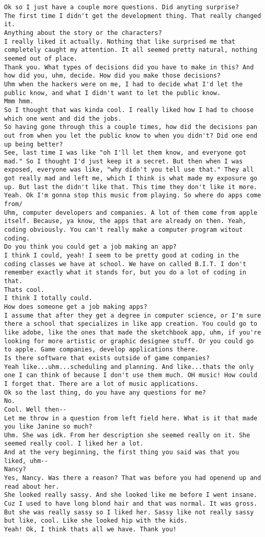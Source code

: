 \begin{lstlisting}
Ok so I just have a couple more questions. Did anyting surprise?
The first time I didn't get the development thing. That really changed it.
Anything about the story or the characters?
I really liked it actually. Nothing that like surprised me that completely caught my attention. It all seemed pretty natural, nothing seemed out of place.
Thank you. What types of decisions did you have to make in this? And how did you, uhm, decide. How did you make those decisions?
Uhm when the hackers were on me, I had to decide what I'd let the public know, and what I didn't want to let the public know. 
Mmm hmm.
So I thought that was kinda cool. I really liked how I had to choose which one went and did the jobs.
So having gone through this a couple times, how did the decisions pan out from when you let the public know to when you didn't? Did one end up being better?
See, last time I was like "oh I'll let them know, and everyone got mad." So I thought I'd just keep it a secret. But then when I was exposed, everyone was like, "why didn't you tell use that." They all got really mad and left me, which I think is what made my exposure go up. But last the didn't like that. This time they don't like it more. 
Yeah. Ok I'm gonna stop this music from playing. So where do apps come from/
Uhm, computer developers and companies. A lot of them come from apple itself. Because, ya know, the apps that are already on then. Yeah, coding obviously. You can't really make a computer program witout coding.
Do you think you could get a job making an app?
I think I could, yeah! I seem to be pretty good at coding in the coding classes we have at school. We have on called B.I.T. I don't remember exactly what it stands for, but you do a lot of coding in that. 
Thats cool.
I think I totally could.
How does someone get a job making apps?
I assume that after they get a degree in computer science, or I'm sure there a school that specializes in like app creation. You could go to like adobe, like the ones that made the sketchbook app, uhm, if you're looking for more artistic or graphic designee stuff. Or you could go to apple. Game companies, develop applications there. 
Is there software that exists outside of game companies?
Yeah like...uhm...scheduling and planning. And like...thats the only one I can think of because I don't use them much. OH music! How could I forget that. There are a lot of music applications.
Ok so the last thing, do you have any questions for me?
No.
Cool. Well then--
Let me throw in a question from left field here. What is it that made you like Janine so much?
Uhm. She was idk. From her description she seemed really on it. She seemed really cool. I liked her a lot.
And at the very beginning, the first thing you said was that you liked, uhm--
Nancy?
Yes, Nancy. Was there a reason? That was before you had openend up and read about her.
She looked really sassy. And she looked like me before I went insane. Cuz I used to have long blond hair and that was normal. It was gross. But she was really sassy so I liked her. Sassy like not really sassy but like, cool. Like she looked hip with the kids.
Yeah! Ok, I think thats all we have. Thank you!
\end{lstlisting}

